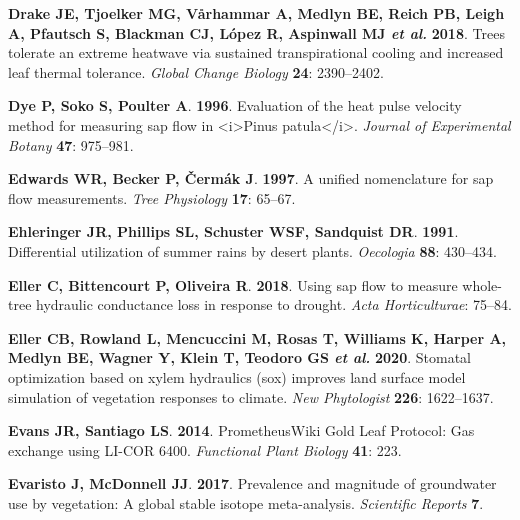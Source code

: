 \documentclass[11pt,twoside]{reedthesis}
\begin{document}
\hypertarget{ref-drake_trees_2018}{}
\textbf{\textnormal{Drake JE}, \textnormal{Tjoelker MG},
\textnormal{Vårhammar A}, \textnormal{Medlyn BE}, \textnormal{Reich PB},
\textnormal{Leigh A}, \textnormal{Pfautsch S}, \textnormal{Blackman CJ},
\textnormal{López R}, \textnormal{Aspinwall MJ} \emph{et al.}}
\textbf{2018}. Trees tolerate an extreme heatwave via sustained
transpirational cooling and increased leaf thermal tolerance.
\emph{Global Change Biology} \textbf{24}: 2390--2402.

\hypertarget{ref-Dye1996}{}
\textbf{\textnormal{Dye P}, \textnormal{Soko S}, \textnormal{Poulter
A}}. \textbf{1996}. Evaluation of the heat pulse velocity method for
measuring sap flow in \textless{}i\textgreater{}Pinus
patula\textless{}/i\textgreater{}. \emph{Journal of Experimental Botany}
\textbf{47}: 975--981.

\hypertarget{ref-Edwards1997}{}
\textbf{\textnormal{Edwards WR}, \textnormal{Becker P},
\textnormal{Čermák J}}. \textbf{1997}. A unified nomenclature for sap
flow measurements. \emph{Tree Physiology} \textbf{17}: 65--67.

\hypertarget{ref-ehleringer_differential_1991}{}
\textbf{\textnormal{Ehleringer JR}, \textnormal{Phillips SL},
\textnormal{Schuster WSF}, \textnormal{Sandquist DR}}. \textbf{1991}.
Differential utilization of summer rains by desert plants.
\emph{Oecologia} \textbf{88}: 430--434.

\hypertarget{ref-eller_using_2018}{}
\textbf{\textnormal{Eller C}, \textnormal{Bittencourt P},
\textnormal{Oliveira R}}. \textbf{2018}. Using sap flow to measure
whole-tree hydraulic conductance loss in response to drought. \emph{Acta
Horticulturae}: 75--84.

\hypertarget{ref-Eller2020}{}
\textbf{\textnormal{Eller CB}, \textnormal{Rowland L},
\textnormal{Mencuccini M}, \textnormal{Rosas T}, \textnormal{Williams
K}, \textnormal{Harper A}, \textnormal{Medlyn BE}, \textnormal{Wagner
Y}, \textnormal{Klein T}, \textnormal{Teodoro GS} \emph{et al.}}
\textbf{2020}. Stomatal optimization based on xylem hydraulics (sox)
improves land surface model simulation of vegetation responses to
climate. \emph{New Phytologist} \textbf{226}: 1622--1637.

\hypertarget{ref-evans_prometheuswiki_2014}{}
\textbf{\textnormal{Evans JR}, \textnormal{Santiago LS}}. \textbf{2014}.
PrometheusWiki Gold Leaf Protocol: Gas exchange using LI-COR 6400.
\emph{Functional Plant Biology} \textbf{41}: 223.

\hypertarget{ref-evaristo2017}{}
\textbf{\textnormal{Evaristo J}, \textnormal{McDonnell JJ}}.
\textbf{2017}. Prevalence and magnitude of groundwater use by
vegetation: A global stable isotope meta-analysis. \emph{Scientific
Reports} \textbf{7}.
\end{document}

